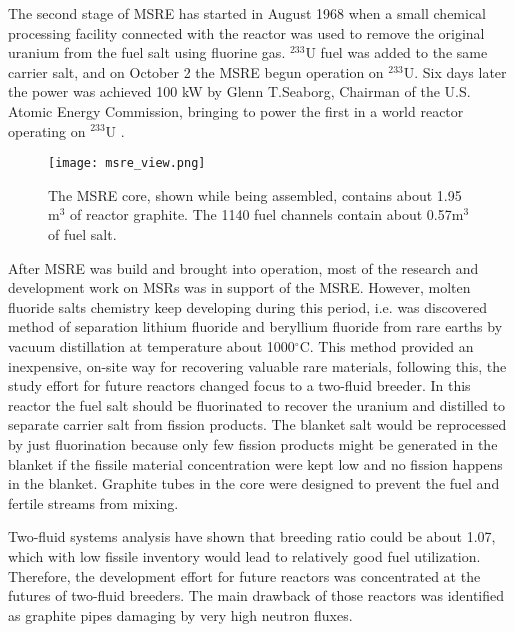 The second stage of \gls{MSRE} has started in August 1968 when a small chemical processing facility connected with the reactor was used to remove the original uranium from the fuel salt using fluorine gas. $^{233}$U fuel was added to the same carrier salt, and on October 2 the \gls{MSRE} begun operation on $^{233}$U. Six days later the power was achieved 100 kW by Glenn T.Seaborg, Chairman of the U.S. Atomic Energy Commission, bringing to power the first in a world reactor operating on $^{233}$U \cite{haubenreich_experience_1970}.

\begin{figure}[htp!] %
  \centering
  \vspace{-0.3em}
  \texttt{[image: msre\_view.png]}
  \caption{The \gls{MSRE} core, shown while being assembled, contains about 1.95 m$^3$ of reactor graphite. The 1140 fuel channels contain about 0.57m$^3$ of fuel salt.}
  \vspace{-0.6em}
  \label{fig:msre}
\end{figure}
\FloatBarrier

After \gls{MSRE} was build and brought into operation, most of the research and development work on \glspl{MSR} was in support of the \gls{MSRE}. However, molten fluoride salts chemistry keep developing during this period, i.e. was discovered method of separation lithium fluoride and beryllium fluoride from rare earths by vacuum distillation at temperature about 1000$^{\circ}$C. This method provided an inexpensive, on-site way for recovering valuable rare materials, following this, the study effort for future reactors changed focus to a two-fluid breeder. In this reactor the fuel salt should be fluorinated to recover the uranium and distilled to separate carrier salt from fission products. The blanket salt would be reprocessed by just fluorination because only few fission products might be generated in the blanket if the fissile material concentration were kept low and no fission happens in the blanket. Graphite tubes in the core were designed to prevent the fuel and fertile streams from mixing.

Two-fluid systems analysis have shown that breeding ratio could be about 1.07, which with low fissile inventory would lead to relatively good fuel utilization. Therefore, the development effort for future reactors was concentrated at the futures of two-fluid breeders. The main drawback of those reactors was identified as graphite pipes damaging by very high neutron fluxes.

